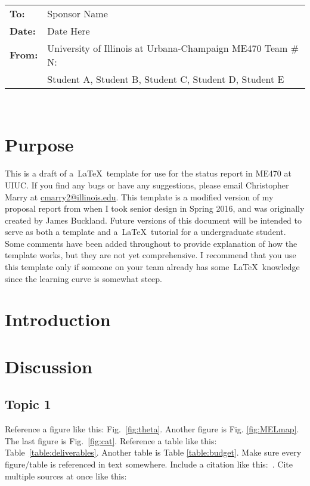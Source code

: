\documentclass[hidelinks,11pt]{article}
\numberwithin{equation}{subsection}
\begin{document}
 \\[0.2cm]
\begin{tabular}{l l}
\textbf{To:} & Sponsor Name \\
\textbf{Date:} & Date Here \\
\textbf{From:} & University of Illinois at Urbana-Champaign ME470 Team \# N:\\
& Student A, Student B, Student C, Student D, Student E
\end{tabular}\\[0.2cm]


\section*{Purpose} %

This is a draft of a~\LaTeX ~template for use for the status report in ME470 at UIUC. If you find any bugs or have any suggestions, please email Christopher Marry at \href{mailto:cmarry2@illinois.edu}{cmarry2@illinois.edu}. This template is a modified version of my proposal report from when I took senior design in Spring 2016, and was originally created by James Buckland. Future versions of this document will be intended to serve as both a template and a~\LaTeX~tutorial for a undergraduate student. Some comments have been added throughout to provide explanation of how the template works, but they are not yet comprehensive. I recommend that you use this template only if someone on your team already has some~\LaTeX~knowledge since the learning curve is somewhat steep.

\section*{Introduction}

\lipsum[1-2]

\section*{Discussion}

\subsection*{Topic 1}

Reference a figure like this: Fig.~\ref{fig:theta}. Another figure is Fig. \ref{fig:MELmap}. The last figure is Fig.~\ref{fig:cat}. Reference a table like this: Table~\ref{table:deliverables}. Another table is Table \ref{table:budget}. Make sure every figure/table is referenced in text somewhere.
Include a citation like this:~\cite{me470site}. Cite multiple sources at once like this: \cite{Nguyen2015,Hovakimyan2010}
\end{document}
